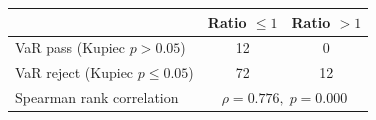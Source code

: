 \begin{tabular}{lcc}
\toprule
 & Ratio $\leq 1$ & Ratio $> 1$ \\
\midrule
  VaR pass (Kupiec $p > 0.05$) & 12 & 0 \\
  VaR reject (Kupiec $p \leq 0.05$) & 72 & 12 \\
\midrule
  Spearman rank correlation & \multicolumn{2}{c}{$\rho = 0.776,\; p = 0.000$} \\
\bottomrule
\end{tabular}